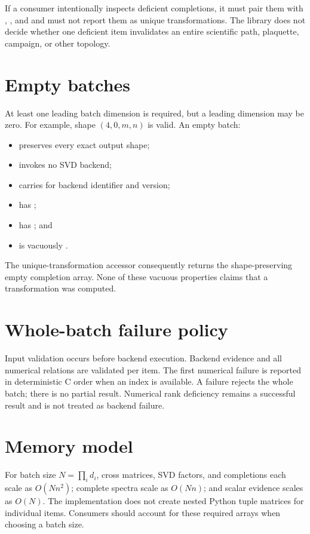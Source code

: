 If a consumer intentionally inspects deficient completions, it must pair them with
, , and  and must not
report them as unique transformations. The library does not decide whether one deficient
item invalidates an entire scientific path, plaquette, campaign, or other topology.

\section{Empty batches}
At least one leading batch dimension is required, but a leading dimension may be zero.
For example, shape $(4,0,m,n)$ is valid. An empty batch:
\begin{itemize}
  \item preserves every exact output shape;
  \item invokes no SVD backend;
  \item carries  for backend identifier and version;
  \item has ;
  \item has ; and
  \item is vacuously .
\end{itemize}
The unique-transformation accessor consequently returns the shape-preserving empty
completion array. None of these vacuous properties claims that a transformation was
computed.

\section{Whole-batch failure policy}
Input validation occurs before backend execution. Backend evidence and all numerical
relations are validated per item. The first numerical failure is reported in
deterministic C order when an index is available. A failure rejects the whole batch;
there is no partial result. Numerical rank deficiency remains a successful result and is
not treated as backend failure.

\section{Memory model}
For batch size $N=\prod_i d_i$, cross matrices, SVD factors, and completions each scale
as $O(Nn^2)$; complete spectra scale as $O(Nn)$; and scalar evidence scales as $O(N)$.
The implementation does not create nested Python tuple matrices for individual items.
Consumers should account for these required arrays when choosing a batch size.
